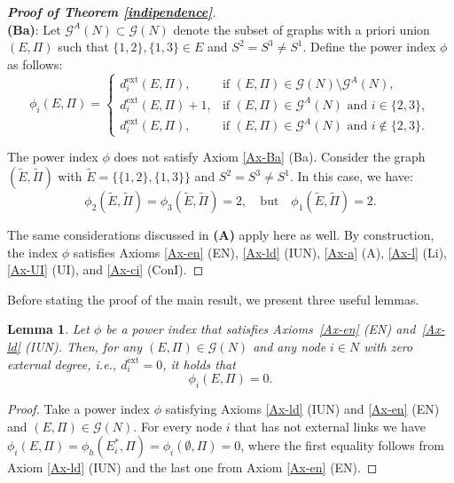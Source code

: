 \documentclass[preprint,11pt,authoryear]{elsarticle}
\theoremstyle{plain}
\newtheorem{lemma}[theorem]{Lemma}
\begin{document}
\begin{proof}[\bf Proof of Theorem \ref{indipendence}]
	
	\noindent\vspace{.5\baselineskip}\\
	\textbf{(Ba)}:  
	Let $\mathcal{G}^A(N) \subset \mathcal{G}(N)$ denote the subset of graphs with a priori union $(E,\Pi)$ such that $\{1,2\}, \{1,3\} \in E$ and $S^2 = S^3 \neq S^1$. Define the power index $\phi$ as follows:
	\begin{equation*}
		\phi_i(E,\Pi) = 
		\begin{cases}
			d_i^{\text{ext}}(E,\Pi), & \text{if } (E,\Pi) \in \mathcal{G}(N) \setminus \mathcal{G}^A(N), \\
			d_i^{\text{ext}}(E,\Pi) + 1, & \text{if } (E,\Pi) \in \mathcal{G}^A(N) \text{ and } i \in \{2,3\}, \\
			d_i^{\text{ext}}(E,\Pi), & \text{if } (E,\Pi) \in \mathcal{G}^A(N) \text{ and } i \notin \{2,3\}.
		\end{cases}
	\end{equation*}
	
	The power index $\phi$ does not satisfy Axiom \ref{Ax-Ba} (Ba). Consider the graph $(\tilde{E}, \tilde{\Pi})$ with $\tilde{E} = \{\{1,2\}, \{1,3\}\}$ and $S^2 = S^3 \neq S^1$. In this case, we have:
	\[
	\phi_2(\tilde{E}, \tilde{\Pi}) = \phi_3(\tilde{E}, \tilde{\Pi}) = 2, \quad \text{but} \quad \phi_1(\tilde{E}, \tilde{\Pi}) = 2.
	\]
	
	The same considerations discussed in \textbf{(A)} apply here as well. By construction, the index $\phi$ satisfies Axioms \ref{Ax-en} (EN), \ref{Ax-ld} (IUN), \ref{Ax-a} (A), \ref{Ax-l} (Li), \ref{Ax-UI} (UI), and \ref{Ax-ci} (ConI).
\end{proof}


Before stating the proof of the main result, we present three useful lemmas.
\begin{lemma}\label{lemma:IUN+EN}
	Let $\phi$ be a power index that satisfies Axioms~\ref{Ax-en} (EN) and~\ref{Ax-ld} (IUN).  
	Then, for any $(E,\Pi) \in \mathcal{G}(N)$ and any node $i \in N$ with zero external degree, i.e., $d_i^{\text{ext}} = 0$, it holds that
	\begin{equation*}
		\phi_i(E, \Pi) = 0.
	\end{equation*}
\end{lemma}
\begin{proof}
	Take a power index $\phi$ satisfying Axioms \ref{Ax-ld} (IUN) and \ref{Ax-en} (EN) and $(E,\Pi)\in\mathcal{G}(N)$. For every node $i$ that has not external links we have $\phi_i(E,\Pi)=\phi_h(E_i^*,\Pi)=\phi_i(\emptyset,\Pi)=0$, where the first equality follows from  Axiom \ref{Ax-ld} (IUN) and the last one from Axiom \ref{Ax-en} (EN).
\end{proof}
\end{document}
